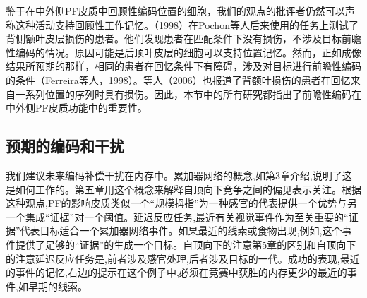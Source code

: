 鉴于在中外侧PF皮质中回顾性编码位置的细胞，我们的观点的批评者仍然可以声称这种活动支持回顾性工作记忆。（1998）在Pochon等人后来使用的任务上测试了背侧额叶皮层损伤的患者。他们发现患者在匹配条件下没有损伤，不涉及目标前瞻性编码的情况。原因可能是后顶叶皮层的细胞可以支持位置记忆。然而，正如成像结果所预期的那样，相同的患者在回忆条件下有障碍，涉及对目标进行前瞻性编码的条件（Ferreira等人，1998）。等人（2006）也报道了背额叶损伤的患者在回忆来自一系列位置的序列时具有损伤。因此，本节中的所有研究都指出了前瞻性编码在中外侧PF皮质功能中的重要性。

\subsection{预期的编码和干扰}
我们建议未来编码补偿干扰在内存中。累加器网络的概念,如第3章介绍,说明了这是如何工作的。第五章用这个概念来解释自顶向下竞争之间的偏见表示关注。根据这种观点,PF的影响皮质类似一个“规模拇指”为一种感官的代表提供一个优势与另一个集成“证据”对一个阈值。延迟反应任务,最近有关视觉事件作为至关重要的“证据”代表目标适合一个累加器网络事件。如果最近的线索或食物出现,例如,这个事件提供了足够的“证据”的生成一个目标。自顶向下的注意第5章的区别和自顶向下的注意延迟反应任务是,前者涉及感官处理,后者涉及目标的一代。成功的表现,最近的事件的记忆,右边的提示在这个例子中,必须在竞赛中获胜的内存更少的最近的事件,如早期的线索。

